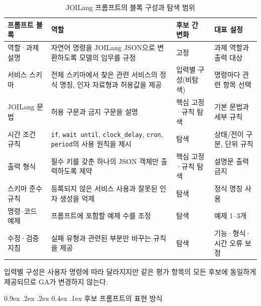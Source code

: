 \documentclass[10pt,twocolumn]{article}
\makeatletter
\newenvironment{revision}{\begingroup\color{revisionblue}}{\endgroup}
\renewcommand{\subsection}{\@startsection{subsection}{2}{\z@}%
{0.9ex \@plus .2ex \@minus .2ex}%
{0.4ex \@plus .1ex}%
{\normalfont\normalsize\bfseries}}
\makeatother
\begin{document}
\begin{revision}
\begin{table}[t]
\color{revisionblue}
\centering
\caption{\textcolor{revisionblue}{JOILang 프롬프트의 블록 구성과 탐색 범위}}
\label{tab:prompt_blocks}
\small
\renewcommand{\arraystretch}{1.10}
\setlength{\tabcolsep}{4.2pt}
\begin{tabularx}{0.98\textwidth}{@{}p{}p{}p{}X@{}}
\toprule
\textbf{프롬프트 블록} & \textbf{역할} & \textbf{후보 간 변화} & \textbf{대표 설정} \\
\midrule
역할·과제 설명 & 자연어 명령을 JOILang JSON으로 변환하도록 모델의 임무를 규정 & 고정 & 과제 역할과 출력 대상 \\
서비스 스키마 & 전체 스키마에서 찾은 관련 서비스의 정식 명칭, 인자 자료형과 허용값을 제공 & 입력별 구성(비탐색) & 명령마다 관련 항목 선택 \\
JOILang 문법 & 허용 구문과 금지 구문을 설명 & 핵심 고정·규칙 탐색 & 기본 문법과 세부 규칙 \\
시간 조건 규칙 & \texttt{if}, \texttt{wait until}, \texttt{clock\_delay}, \texttt{cron}, \texttt{period}의 사용 원칙을 제시 & 탐색 & 상태/전이 구분, 단위 규칙 \\
출력 형식 & 필수 키를 갖춘 하나의 JSON 객체만 출력하도록 제약 & 핵심 고정·규칙 탐색 & 설명문 출력 금지 \\
스키마 준수 규칙 & 등록되지 않은 서비스 사용과 잘못된 인자 생성을 억제 & 탐색 & 정식 명칭 사용 \\
명령--코드 예제 & 프롬프트에 포함할 예제 수를 조정 & 탐색 & 예제 1--3개 \\
수정·검증 지침 & 실패 유형과 관련된 부분만 바꾸는 규칙을 제공 & 탐색 & 기능·형식·시간 오류 보정 \\
\bottomrule
\end{tabularx}
\vspace{0.2em}

{\footnotesize 입력별 구성은 사용자 명령에 따라 달라지지만 같은 평가 항목의 모든 후보에 동일하게 제공되므로 GA가 변경하지 않는다.}
\end{table}
\end{revision}

\subsection{후보 프롬프트의 표현 방식}
\end{document}
